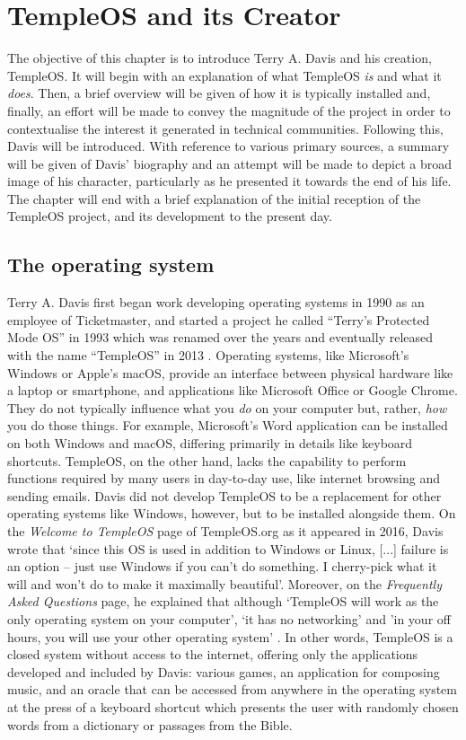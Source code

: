 \documentclass[Draft.tex]{subfiles}
\begin{document}
\chapter{TempleOS and its Creator}

The objective of this chapter is to introduce Terry A. Davis
and his creation, TempleOS.
It will begin with an explanation of what TempleOS \textit{is}
and what it \textit{does}.
Then, a brief overview will be given of how it is typically installed
and, finally, an effort will be made to convey
the magnitude of the project in order to contextualise
the interest it generated in technical communities.
Following this, Davis will be introduced.
With reference to various primary sources,
a summary will be given of Davis' biography and
an attempt will be made to depict a broad image of his character,
particularly as he presented it towards the end of his life.
The chapter will end with a brief explanation of the initial reception of
the TempleOS project, and its development to the present day.

\section*{The operating system}

Terry A. Davis first began work developing operating systems in 1990
as an employee of Ticketmaster, and started a project he called
``Terry's Protected Mode OS'' in 1993 which was renamed over the years
and eventually released with the name ``TempleOS'' in 2013
\parencite{History}.
Operating systems, like Microsoft's Windows or Apple's macOS,
provide an interface between physical hardware like a laptop or smartphone,
and applications like Microsoft Office or Google Chrome.
They do not typically influence what you \textit{do}
on your computer but, rather, \textit{how} you do those things.
For example, Microsoft's Word application can be installed on both
Windows and macOS, differing primarily in details like keyboard shortcuts.
TempleOS, on the other hand, lacks the capability to perform functions
required by many users in day-to-day use,
like internet browsing and sending emails.
Davis did not develop TempleOS to be a replacement for other operating systems
like Windows, however, but to be installed alongside them.
On the \textit{Welcome to TempleOS} page of TempleOS.org
as it appeared in 2016\footnotemark, Davis \parencite*{Welcome} wrote that
`since this OS is used in addition to Windows or Linux,
[...] failure is an option -- just use Windows if you can't do something.
I cherry-pick what it will and won't do to make it maximally beautiful'.
Moreover, on the \textit{Frequently Asked Questions} page, he explained that
although `TempleOS will work as the only operating system on your computer',
`it has no networking' and 'in your off hours,
you will use your other operating system' \parencite{FAQ}.
In other words, TempleOS is a closed system without access to the internet,
offering only the applications developed and included by Davis:
various games, an application for composing music,
and an oracle that can be accessed from anywhere in the operating system
at the press of a keyboard shortcut which presents the user with randomly
chosen words from a dictionary or passages from the Bible.
\end{document}
